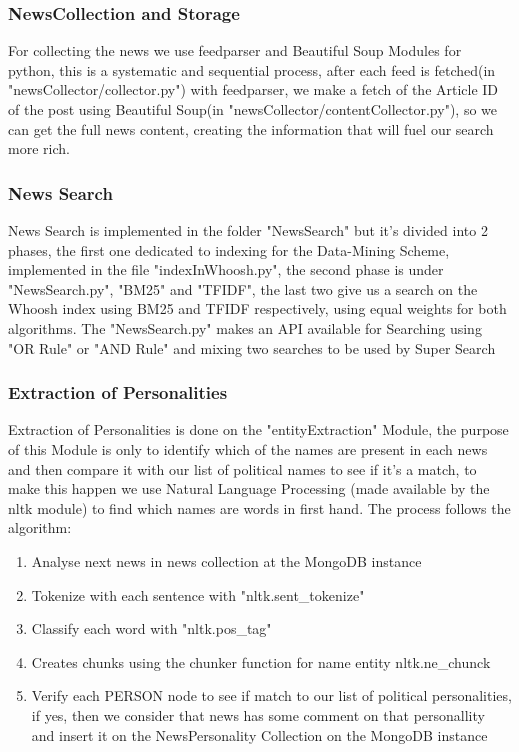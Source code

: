 \documentclass{acm_proc_article-sp}
\begin{document}
\subsubsection{NewsCollection and Storage}

For collecting the news we use feedparser and Beautiful Soup Modules for python, this is a systematic and sequential process, after each feed is fetched(in "newsCollector/collector.py") with feedparser, we make a fetch of the Article ID of the post using Beautiful Soup(in "newsCollector/contentCollector.py"), so we can get the full news content, creating the information that will fuel our search more rich.

\subsubsection{News Search}
 
News Search is implemented in the folder "NewsSearch" but it's divided into 2 phases, the first one dedicated to indexing for the Data-Mining Scheme, implemented in the file "indexInWhoosh.py", the second phase is under "NewsSearch.py", "BM25" and "TFIDF", the last two give us a search on the Whoosh index using BM25 and TFIDF respectively, using equal weights for both algorithms. The "NewsSearch.py" makes an API available for Searching using "OR Rule" or "AND Rule" and mixing two searches to be used by Super Search

\subsubsection{Extraction of Personalities}

Extraction of Personalities is done on the "entityExtraction" Module, the purpose of this Module is only to identify which of the names are present in each news and then compare it with our list of political names to see if it's a match, to make this happen we use Natural Language Processing (made available by the nltk module) to find which names are words in first hand. The process follows the algorithm:

\begin{enumerate}
  \item Analyse next news in news collection at the MongoDB instance
  \item Tokenize with each sentence with "nltk.sent\_tokenize"
  \item Classify each word with "nltk.pos\_tag"
  \item Creates chunks using the chunker function for name entity nltk.ne\_chunck
  \item Verify each PERSON node to see if match to our list of political personalities, if yes, then we consider that news has some comment on that personallity and insert it on the NewsPersonality Collection on the MongoDB instance
\end{enumerate} 
\end{document}
